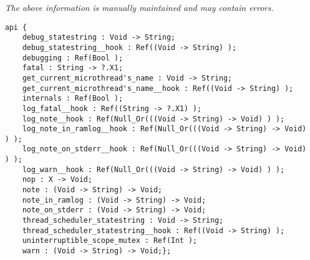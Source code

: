 \label{pkg:log}

{\tiny \it The above information is manually maintained and may contain errors.}
\begin{verbatim}
api {
    debug_statestring : Void -> String;
    debug_statestring__hook : Ref((Void -> String) );
    debugging : Ref(Bool );
    fatal : String -> ?.X1;
    get_current_microthread's_name : Void -> String;
    get_current_microthread's_name__hook : Ref((Void -> String) );
    internals : Ref(Bool );
    log_fatal__hook : Ref((String -> ?.X1) );
    log_note__hook : Ref(Null_Or(((Void -> String) -> Void) ) );
    log_note_in_ramlog__hook : Ref(Null_Or(((Void -> String) -> Void) ) );
    log_note_on_stderr__hook : Ref(Null_Or(((Void -> String) -> Void) ) );
    log_warn__hook : Ref(Null_Or(((Void -> String) -> Void) ) );
    nop : X -> Void;
    note : (Void -> String) -> Void;
    note_in_ramlog : (Void -> String) -> Void;
    note_on_stderr : (Void -> String) -> Void;
    thread_scheduler_statestring : Void -> String;
    thread_scheduler_statestring__hook : Ref((Void -> String) );
    uninterruptible_scope_mutex : Ref(Int );
    warn : (Void -> String) -> Void;};
\end{verbatim}
